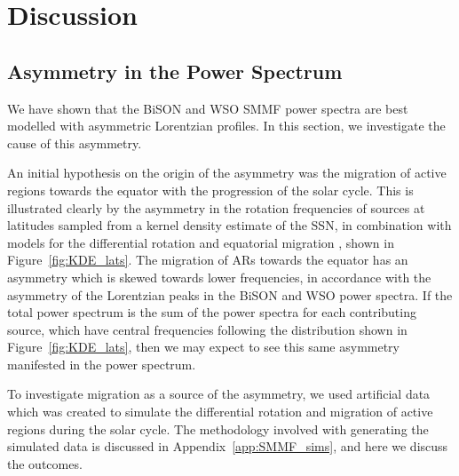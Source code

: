 \section{Discussion}\label{sec:SMMF_artificial}


\subsection{Asymmetry in the Power Spectrum}
\label{sec:asymmetry}

We have shown that the BiSON and WSO SMMF power spectra are best modelled with asymmetric Lorentzian profiles. In this section, we investigate the cause of this asymmetry. 

An initial hypothesis on the origin of the asymmetry was the migration of active regions towards the equator with the progression of the solar cycle. This is illustrated clearly by the asymmetry in the rotation frequencies of sources at latitudes sampled from a kernel density estimate of the SSN, in combination with models for the differential rotation \citep{snodgrass_magnetic_1983} and equatorial migration \citep{li_latitude_2001}, shown in Figure~\ref{fig:KDE_lats}. The migration of ARs towards the equator has an asymmetry which is skewed towards lower frequencies, in accordance with the asymmetry of the Lorentzian peaks in the BiSON and WSO power spectra. If the total power spectrum is the sum of the power spectra for each contributing source, which have central frequencies following the distribution shown in Figure~\ref{fig:KDE_lats}, then we may expect to see this same asymmetry manifested in the power spectrum.

To investigate migration as a source of the asymmetry, we used artificial data which was created to simulate the differential rotation and migration of active regions during the solar cycle. The methodology involved with generating the simulated data is discussed in Appendix~\ref{app:SMMF_sims}, and here we discuss the outcomes.

